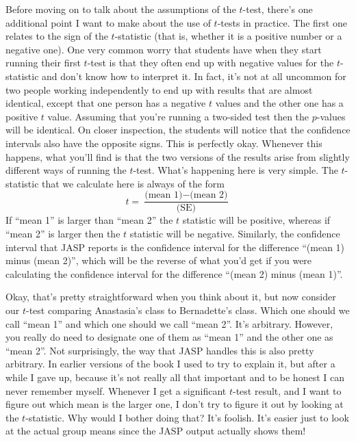 Before moving on to talk about the assumptions of the $t$-test, there's one additional point I want to make about the use of $t$-tests in practice. The first one relates to the sign of the $t$-statistic (that is, whether it is a positive number or a negative one).  One very common worry that students have when they start running their first $t$-test is that they often end up with negative values for the $t$-statistic and don't know how to interpret it. In fact, it's not at all uncommon for two  people working independently to end up with results that are almost identical, except that one person has a negative $t$ values and the other one has a positive $t$ value. Assuming that you're running a two-sided test then the $p$-values will be identical. On closer inspection, the students will notice that the confidence intervals also have the opposite signs. This is perfectly okay. Whenever this happens, what you'll find is that the two versions of the results arise from slightly different ways of running the $t$-test. What's happening here is very simple. The $t$-statistic that we calculate here is always of the form 
$$
t = \frac{\mbox{(mean 1)} -\mbox{(mean 2)}}{ \mbox{(SE)}}
$$
If ``mean 1'' is larger than ``mean 2'' the $t$ statistic will be positive, whereas if ``mean 2'' is larger then the $t$ statistic will be negative. Similarly, the confidence interval that JASP reports is the confidence interval for the difference ``(mean 1) minus (mean 2)'', which will be the reverse of what you'd get if you were calculating the confidence interval for the difference ``(mean 2) minus (mean 1)''.

Okay, that's pretty straightforward when you think about it, but now consider our $t$-test comparing Anastasia's class to Bernadette's class. Which one should we call ``mean 1'' and which one should we call ``mean 2''. It's arbitrary. However, you really do need to designate one of them as ``mean 1'' and the other one as ``mean 2''. Not surprisingly, the way that JASP handles this is also pretty arbitrary. In earlier versions of the book I used to try to explain it, but after a while I gave up, because it's not really all that important and to be honest I can never remember myself. Whenever I get a significant $t$-test result, and I want to figure out which mean is the larger one, I don't try to figure it out by looking at the $t$-statistic. Why would I bother doing that? It's foolish. It's easier just to look at the actual group means since the JASP output actually shows them!

